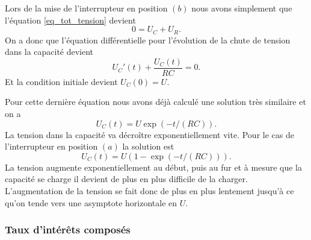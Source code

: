 \documentclass[a4paper,12pt]{book}
\begin{document}
Lors de la mise de l'interrupteur en position $(b)$ nous avons simplement que l'équation \eqref{eq_tot_tension} devient
\begin{equation}
 0=U_C+U_R.\label{eq_tot_tension_0}
\end{equation}
On a donc que l'équation différentielle pour l'évolution de la chute de tension dans la capacité devient 
\begin{equation}
 U_C'(t)+\frac{U_C(t)}{RC}=0.
\end{equation}
Et la condition initiale devient $U_C(0)=U$.

Pour cette dernière équation nous avons déjà calculé une solution très similaire et on a
\begin{equation}
 U_C(t)=U\exp(-t/(RC)).
\end{equation}
La tension dans la capacité va décroître exponentiellement vite.
Pour le cas de l'interrupteur en position $(a)$ la solution est 
\begin{equation}
 U_C(t)=U(1-\exp(-t/(RC))).
\end{equation}
La tension augmente exponentiellement au début, puis au fur et à mesure que la capacité se charge il devient de plus en plus difficile 
de la charger. L'augmentation de la tension se fait donc de plus en plus lentement jusqu'à ce qu'on tende vers une asymptote horizontale
en $U$.

\subsubsection{Taux d'intérêts composés}
\end{document}
